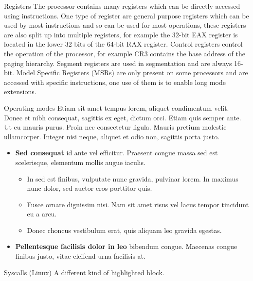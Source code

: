 \documentclass[final]{beamer}
\newlength{\colwidth}
\begin{document}
\begin{frame}[t]
\begin{columns}[t]
\begin{column}{\colwidth}
  \begin{block}{Registers}
    The processor contains many registers which can be directly accessed using instructions.
    One type of register are general purpose registers which can be used by most instructions and so can be used for most operations, these registers are also split up into multiple registers, for example the 32-bit EAX register is located in the lower 32 bits of the 64-bit RAX register.
    Control registers control the operation of the processor, for example CR3 contains the base address of the paging hierarchy.
    Segment registers are used in segmentation and are always 16-bit.
    Model Specific Registers (MSRs) are only present on some processors and are accessed with specific instructions, one use of them is to enable long mode extensions.
  \end{block}

  \begin{block}{Operating modes}
    Etiam sit amet tempus lorem, aliquet condimentum velit. Donec et nibh
    consequat, sagittis ex eget, dictum orci. Etiam quis semper ante. Ut eu
    mauris purus. Proin nec consectetur ligula. Mauris pretium molestie
    ullamcorper. Integer nisi neque, aliquet et odio non, sagittis porta justo.

    \begin{itemize}
      \item \textbf{Sed consequat} id ante vel efficitur. Praesent congue massa
        sed est scelerisque, elementum mollis augue iaculis.
        \begin{itemize}
          \item In sed est finibus, vulputate
            nunc gravida, pulvinar lorem. In maximus nunc dolor, sed auctor eros
            porttitor quis.
          \item Fusce ornare dignissim nisi. Nam sit amet risus vel lacus
            tempor tincidunt eu a arcu.
          \item Donec rhoncus vestibulum erat, quis aliquam leo
            gravida egestas.
        \end{itemize}
      \item \textbf{Pellentesque facilisis dolor in leo} bibendum congue.
        Maecenas congue finibus justo, vitae eleifend urna facilisis at.
    \end{itemize}
  \end{block}

  \begin{block}{Syscalls (Linux)}
    A different kind of highlighted block.


\end{block}
\end{column}
\end{columns}
\end{frame}
\end{document}
